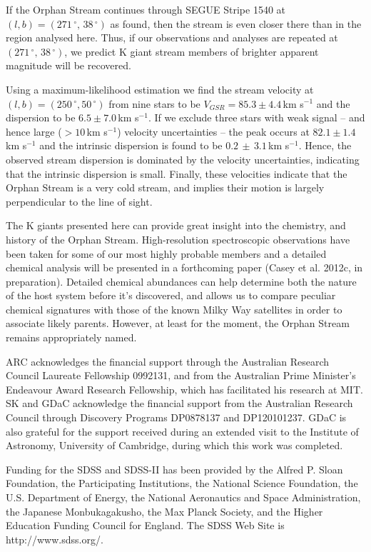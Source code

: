 \documentclass[10pt,apjl]{emulateapj}
\begin{document}
If the Orphan Stream continues through SEGUE Stripe 1540 at $(l, b) = (271\,^\circ,\,38\,^\circ)$ as \citet{Newberg_et-al_2010} found, then the stream is even closer there than in the region analysed here. Thus, if our observations and analyses are repeated at $(271\,^\circ,\,38\,^\circ)$, we predict K giant stream members of brighter apparent magnitude will be recovered.

Using a maximum-likelihood estimation we find the stream velocity at $(l, b) = (250\,^\circ, 50\,^\circ)$ from nine stars to be $V_{GSR} = 85.3 \pm 4.4$\,km s$^{-1}$ and the dispersion to be $6.5 \pm 7.0$\,km s$^{-1}$. If we exclude three stars with weak signal \--- and hence large ($> 10$\,km s$^{-1}$) velocity uncertainties \--- the peak occurs at $82.1 \pm 1.4$\,km s$^{-1}$ and the intrinsic dispersion is found to be $0.2\,\pm\,3.1$\,km s$^{-1}$. Hence, the observed stream dispersion is dominated by the velocity uncertainties, indicating that the intrinsic dispersion is small. Finally, these velocities indicate that the Orphan Stream is a very cold stream, and implies their motion is largely perpendicular to the line of sight.

The K giants presented here can provide great insight into the chemistry, and history of the Orphan Stream. High-resolution spectroscopic observations have been taken for some of our most highly probable members and a detailed chemical analysis will be presented in a forthcoming paper (Casey et al. 2012c, in preparation). Detailed chemical abundances can help determine both the nature of the host system before it's discovered, and allows us to compare peculiar chemical signatures with those of the known Milky Way satellites in order to associate likely parents. However, at least for the moment, the Orphan Stream remains appropriately named.


\acknowledgements
ARC acknowledges the financial support through the Australian Research Council Laureate Fellowship 0992131, and from the Australian Prime Minister's Endeavour Award Research Fellowship, which has facilitated his research at MIT. SK and GDaC acknowledge the financial support from the Australian Research Council through Discovery Programs DP0878137 and DP120101237. GDaC is also grateful for the support received during an extended visit to the Institute of Astronomy, University of Cambridge, during which this work was completed.

Funding for the SDSS and SDSS-II has been provided by the Alfred P. Sloan Foundation, the Participating Institutions, the National Science Foundation, the U.S. Department of Energy, the National Aeronautics and Space Administration, the Japanese Monbukagakusho, the Max Planck Society, and the Higher Education Funding Council for England. The SDSS Web Site is http://www.sdss.org/.
\end{document}
